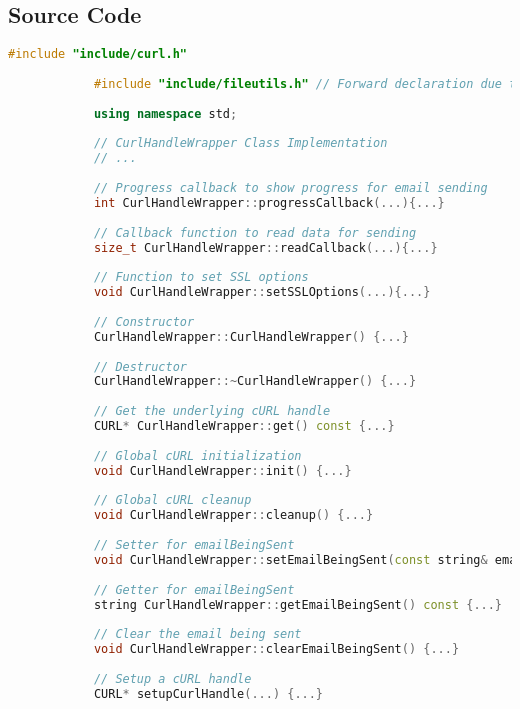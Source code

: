 \documentclass{article}
\begin{document}
	\subsection*{Source Code}
	\begin{mdframed}[backgroundcolor=background, hidealllines=false, innerleftmargin=15pt, innerrightmargin=5pt, innertopmargin=0pt, innerbottommargin=-5pt, linecolor=accent]
		\begin{lstlisting}[language=C++]
			#include "include/curl.h"
			
			#include "include/fileutils.h" // Forward declaration due to circular dependency between fileutils.h and errorhandler.h
			
			using namespace std;
			
			// CurlHandleWrapper Class Implementation
			// ...
			
			// Progress callback to show progress for email sending
			int CurlHandleWrapper::progressCallback(...){...}
			
			// Callback function to read data for sending
			size_t CurlHandleWrapper::readCallback(...){...}
			
			// Function to set SSL options
			void CurlHandleWrapper::setSSLOptions(...){...}
			
			// Constructor
			CurlHandleWrapper::CurlHandleWrapper() {...}
			
			// Destructor
			CurlHandleWrapper::~CurlHandleWrapper() {...}
			
			// Get the underlying cURL handle
			CURL* CurlHandleWrapper::get() const {...}
			
			// Global cURL initialization
			void CurlHandleWrapper::init() {...}
			
			// Global cURL cleanup
			void CurlHandleWrapper::cleanup() {...}
			
			// Setter for emailBeingSent
			void CurlHandleWrapper::setEmailBeingSent(const string& email) {...}
			
			// Getter for emailBeingSent
			string CurlHandleWrapper::getEmailBeingSent() const {...}
			
			// Clear the email being sent
			void CurlHandleWrapper::clearEmailBeingSent() {...}
			
			// Setup a cURL handle
			CURL* setupCurlHandle(...) {...}
		\end{lstlisting}
	\end{mdframed}
	
\end{document}
